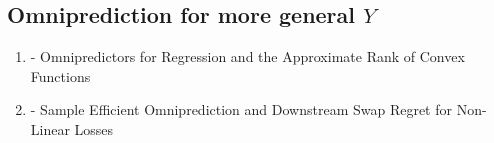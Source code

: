 

\subsection{Omniprediction for more general $Y$}
\begin{enumerate}
    \item \cite{gopalan2022omnipredictors} - Omnipredictors for Regression and the Approximate Rank of Convex Functions
    \item \cite{lu2025omni_nonlinear} - Sample Efficient Omniprediction and Downstream Swap Regret for Non-Linear Losses
\end{enumerate}

